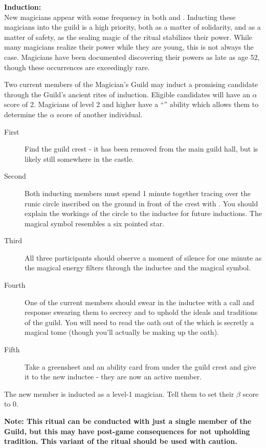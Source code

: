 \documentclass[blue]{NeptuneBall}
\begin{document}
{\bf Induction:}\\
New magicians appear with some frequency in both \pPacifica{} and \pAtlantis{}. Inducting these magicians into the guild is a high priority, both as a matter of solidarity, and as a matter of safety, as the sealing magic of the ritual stabilizes their power. While many magicians realize their power while they are young, this is not always the case. Magicians have been documented discovering their powers as late as age 52, though these occurrences are exceedingly rare.

Two current members of the Magician's Guild may induct a promising candidate through the Guild's ancient rites of induction. Eligible candidates will have an $\alpha$ score of 2. Magicians of level 2 and higher have a ``\aPerceive{}'' ability which allows them to determine the $\alpha$ score of another individual.
\begin{description}
\item[First] Find the guild crest - it has been removed from the main guild hall, but is likely still somewhere in the castle. 
\item[Second] Both inducting members must spend 1 minute together tracing over the runic circle inscribed on the ground in front of the crest with \iChalk{}. You should explain the workings of the circle to the inductee for future inductions. The magical symbol resembles a six pointed star. 
\item[Third] All three participants should observe a moment of silence for one minute as the magical energy filters through the inductee and the magical symbol. 
\item[Fourth] One of the current members should swear in the inductee with a call and response swearing them to secrecy and to uphold the ideals and traditions of the guild. You will need to read the oath out of the \iBook{} which is secretly a magical tome (though you'll actually be making up the oath). 
\item[Fifth] Take a greensheet and an ability card from under the guild crest and give it to the new inductee - they are now an active member.
\end{description}

The new member is inducted as a level-1 magician. Tell them to set their $\beta$ score to 0.

{\bf Note: This ritual can be conducted with just a single member of the Guild, but this may have post-game consequences for not upholding tradition. This variant of the ritual should be used with caution.}
\end{document}
